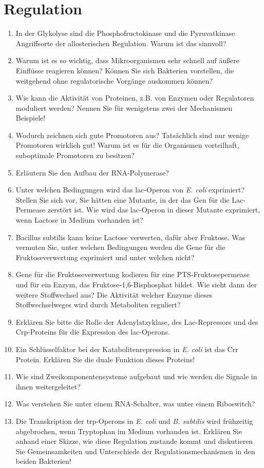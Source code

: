 
\section{Regulation}
\begin{enumerate}
	\item In der Glykolyse sind die Phosphofructokinase und die Pyruvatkinase Angriffsorte der allosterischen Regulation. Warum ist das sinnvoll?
	\item Warum ist es so wichtig, dass Mikroorganismen sehr schnell auf äußere Einflüsse reagieren können? Können Sie sich Bakterien vorstellen, die weitgehend ohne regulatorische Vorgänge auskommen können?
	\item Wie kann die Aktivität von Proteinen, z.B. von Enzymen oder Regulatoren moduliert werden? Nennen Sie für wenigstens zwei der Mechanismen Beispiele!
	\item Wodurch zeichnen sich gute Promotoren aus? Tatsächlich sind nur wenige Promotoren wirklich gut! Warum ist es für die Organismen vorteilhaft, suboptimale Promotoren zu besitzen? 
	\item Erläutern Sie den Aufbau der RNA-Polymerase?
	\item Unter welchen Bedingungen wird das lac-Operon von \emph{E. coli} exprimiert? Stellen Sie sich vor, Sie hätten eine Mutante, in der das Gen für die Lac-Permease zerstört  ist. Wie wird das lac-Operon in dieser Mutante exprimiert, wenn Lactose in Medium vorhanden ist?
	\item Bacillus subtilis kann keine Lactose verwerten, dafür aber Fruktose. Was vermuten Sie, unter welchen Bedingungen werden die Gene für die Fruktoseverwertung exprimiert und unter welchen nicht?
	\item  Gene für die Fruktoseverwertung kodieren für eine PTS-Fruktosepermease und für ein Enzym, das Fruktose-1,6-Bisphosphat bildet. Wie sieht dann der weitere Stoffwechsel aus? Die Aktivität welcher Enzyme dieses Stoffwechselweges wird durch Metaboliten reguliert?
	\item Erklären Sie  bitte die Rolle der Adenylatzyklase, des Lac-Repressors und des Crp-Proteins für die Expression des lac-Operons.
	\item Ein Schlüsselfaktor bei der Katabolitenrepression in \emph{E. coli} ist das Crr Protein. Erklären Sie die duale Funktion dieses Proteins!
	\item Wie sind Zweikomponentensysteme aufgebaut und wie werden die Signale in ihnen weitergeleitet?
	\item Was verstehen Sie unter einem RNA-Schalter, was unter einem Riboswitch?
	\item Die Transkription der trp-Operons in \emph{E. coli} und \emph{B. subtilis} wird frühzeitig abgebrochen, wenn Tryptophan im Medium vorhanden ist. Erklären Sie anhand einer Skizze, wie diese Regulation zustande kommt und diskutieren Sie Gemeinsamkeiten und Unterschiede der Regulationsmechanismen in den beiden Bakterien!
\end{enumerate}
